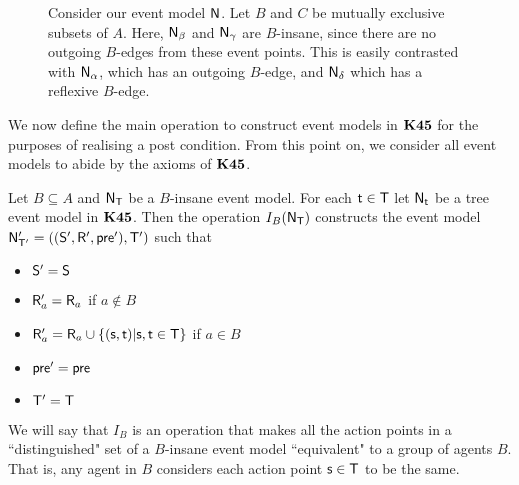 \begin{figure}[ht!]
\centering
{}
\caption{Consider our event model $\mathrm{\mathsf{N}}$. Let $B$ and $C$ be mutually exclusive
  subsets of $A$. Here, $\mathrm{\mathsf{N}}_\beta$ and $\mathrm{\mathsf{N}}_\gamma$
  are $B$-insane, since there are no outgoing $B$-edges from these event points.
This is easily contrasted with $\mathrm{\mathsf{N}}_\alpha$, which has an outgoing $B$-edge,
     and $\mathrm{\mathsf{N}}_\delta$ which has a reflexive $B$-edge.}
\label{bInsaneExample}
\end{figure}

We now define the main operation to construct event models in $\bf K45$ for the
purposes of realising a post condition.
From this point on, we consider all event models to abide by the axioms of $\bf K45$.

\begin{defn} \label{makeEquivalence}
	Let $B \subseteq A$ and $\mathrm{\mathsf{N}}_\mathrm{\mathsf{T}}$ be a $B$-insane event model.
  For each $\mathrm{\mathsf{t}} \in \mathrm{\mathsf{T}}$ let $\mathrm{\mathsf{N}}_\mathrm{\mathsf{t}}$ be a tree event model in $\bf K45$.
  Then the operation $I_B(\mathrm{\mathsf{N}}_\mathrm{\mathsf{T}})$ constructs the event model $\mathrm{\mathsf{N}}'_{\mathrm{\mathsf{T}}'} =
  ((\mathrm{\mathsf{S}}',\mathrm{\mathsf{R}}',\mathrm{\mathsf{pre}}'),\mathrm{\mathsf{T}}')$ such that
  \begin{itemize}
    \item $\mathrm{\mathsf{S}}' = \mathrm{\mathsf{S}}$
    \item $\mathrm{\mathsf{R}}'_a = \mathrm{\mathsf{R}}_a$ if $a \notin B$
    \item $\mathrm{\mathsf{R}}'_a = \mathrm{\mathsf{R}}_a \cup \{(\mathrm{\mathsf{s}}, \mathrm{\mathsf{t}}) | \mathrm{\mathsf{s}}, \mathrm{\mathsf{t}} \in \mathrm{\mathsf{T}}\}$ if $a
    \in B$
    \item $\mathrm{\mathsf{pre}}' = \mathrm{\mathsf{pre}}$
    \item $\mathrm{\mathsf{T}}' = \mathrm{\mathsf{T}}$
  \end{itemize}
\end{defn}

We will say that $I_B$ is an operation that makes all the action
points in a ``distinguished" set of a $B$-insane event model ``equivalent" to a
group of agents $B$.
That is, any agent in $B$ considers each action point $\mathrm{\mathsf{s}} \in \mathrm{\mathsf{T}}$ to be the
same.

